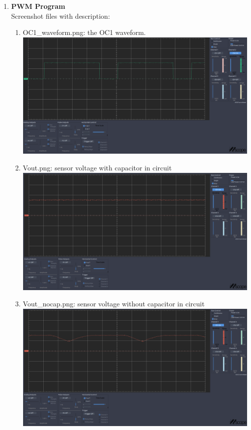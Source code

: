 \documentclass{article}
\begin{document}
\begin{enumerate}[label=\textbf{24.2.2})]
    \item \textbf{PWM Program} \\
    
    Screenshot files with description:

    \begin{enumerate}
        \item OC1\_waveform.png: the OC1 waveform. \\
        
        \includegraphics[width=\linewidth]{OC1_waveform.png}
        \pagebreak
        \item Vout.png: sensor voltage with capacitor in circuit \\
        
        \includegraphics[width=\linewidth]{Vout.png}
        \item Vout\_nocap.png: sensor voltage without capacitor in circuit \\
        
        \includegraphics[width=\linewidth]{Vout_nocap.png}
    \end{enumerate}

\end{enumerate}
\end{document}
